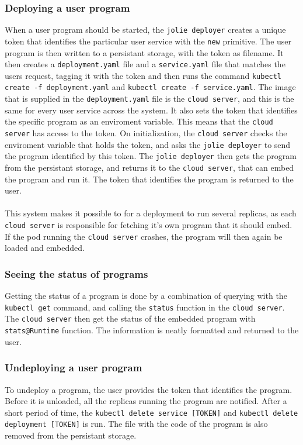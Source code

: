 \documentclass[Report.tex]{subfiles}
\begin{document}
\subsubsection{Deploying a user program}
When a user program should be started, the {\tt jolie deployer} creates a unique token that identifies the particular user service with the {\tt new} primitive. The user program is then written to a persistant storage, with the token as filename. It then creates a {\tt deployment.yaml} file and a {\tt service.yaml} file that matches the users request, tagging it with the token and then runs the command {\tt kubectl create -f deployment.yaml} and {\tt kubectl create -f service.yaml}. The image that is supplied in the {\tt deployment.yaml} file is the {\tt cloud server}, and this is the same for every user service across the system. It also sets the token that identifies the specific program as an enviroment variable. This means that the {\tt cloud server} has access to the token. On initialization, the {\tt cloud server} checks the enviroment variable that holds the token, and asks the {\tt jolie deployer} to send the program identified by this token. The {\tt jolie deployer} then gets the program from the persistant storage, and returns it to the {\tt cloud server}, that can embed the program and run it. The token that identifies the program is returned to the user.
\\\\
This system makes it possible to for a deployment to run several replicas, as each {\tt cloud server} is responsible for fetching it's own program that it should embed. If the pod running the {\tt cloud server} crashes, the program will then again be loaded and embedded.
\subsubsection{Seeing the status of programs}
Getting the status of a program is done by a combination of querying with the {\tt kubectl get} command, and calling the {\tt status} function in the {\tt cloud server}. The {\tt cloud server} then get the status of the embedded program with {\tt stats@Runtime} function. The information is neatly formatted and returned to the user.
\subsubsection{Undeploying a user program}
To undeploy a program, the user provides the token that identifies the program. Before it is unloaded, all the replicas running the program are notified. After a short period of time, the {\tt kubectl delete service [TOKEN]} and {\tt kubectl delete deployment [TOKEN]} is run. The file with the code of the program is also removed from the persistant storage.
\end{document}
